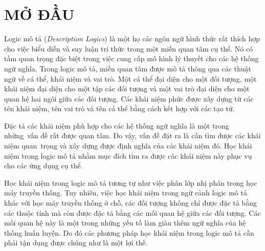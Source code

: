 \chapter*{MỞ ĐẦU}
\label{ChapterMoDau}
\thispagestyle{fancy}

\fontsize{13.5}{15}\selectfont
Logic mô tả ({\em Description Logics}) là một họ các ngôn ngữ hình thức rất thích hợp cho việc biểu diễn và suy luận tri thức trong một miền quan tâm cụ thể. Nó có tầm quan trọng đặc biệt trong việc cung cấp mô hình lý thuyết cho các hệ thống ngữ nghĩa. Trong logic mô tả, miền quan tâm được mô tả thông qua các thuật ngữ về cá thể, khái niệm và vai trò. Một cá thể đại diện cho một đối tượng, một khái niệm đại diện cho một tập các đối tượng và một vai trò đại diện cho một quan hệ hai ngôi giữa các đối tượng. Các khái niệm phức được xây dựng từ các tên khái niệm, tên vai trò và tên cá thể bằng cách kết hợp với các tạo tử.

Đặc tả các khái niệm phù hợp cho các hệ thống ngữ nghĩa là một trong những~vấn đề rất được quan tâm. Do vậy, vấn đề đặt ra là cần tìm được các khái niệm quan~trọng và xây dựng được định nghĩa của các khái niệm đó. Học khái niệm trong logic mô tả nhằm mục đích tìm ra được các khái niệm này phục vụ cho các ứng dụng cụ thể.

Học khái niệm trong logic mô tả tương tự như việc phân lớp nhị phân trong học máy truyền thống. Tuy nhiên, việc học khái niệm trong ngữ cảnh logic mô tả khác với học máy truyền thống ở chỗ, các đối tượng không chỉ được đặc tả bằng các thuộc tính mà còn được đặc tả bằng các mối quan hệ giữa các đối tượng. Các mối quan hệ này là một trong những yếu tố làm giàu thêm ngữ nghĩa của hệ thống huấn luyện. Do đó các phương pháp học khái niệm trong logic mô tả cần phải tận dụng được chúng như là một lợi thế.

